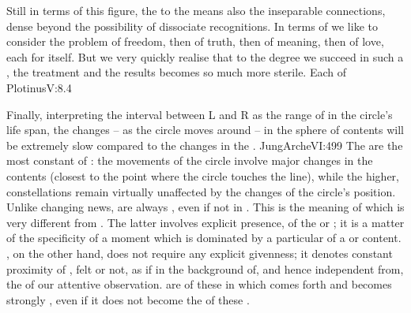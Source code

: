 Still in terms of this figure, the  to the  means also
the inseparable connections, dense beyond the possibility of dissociate
recognitions. In terms of  we like to
consider the problem of freedom, then of truth, then of meaning, then of love,
each for itself. But we very quickly realise that to the degree we succeed in
such a , the treatment and the results becomes so much more
sterile. Each of  \citet{contains all within itself, and at the
  same time sees all in every other, so that everywhere there is all, and all is
  all and each all [...] In our real all is part rising from part and nothing
  can be more than partial; but There each being is an eternal product of a
  whole and is at once a whole and an individual manifesting as part but, to the
  keen vision There, known for the whole it is.}{Plotinus}{V:8.4}

Finally, interpreting the interval between L and R as the range of
 in the circle's life span, the changes -- as the circle moves
around -- in the sphere of  contents will be extremely slow
compared to the changes in the .  \citet{Whereas we think
  in periods of years, the unconscious thinks and lives in terms of
  millennia.}{JungArche}{VI:499} The  are the most constant
 of : the movements of the circle involve major
changes in the  contents (closest to the point where the circle
touches the line), while the higher,  constellations remain
virtually unaffected by the changes of the circle's position.  Unlike changing
 news,  are always , even if not
 in . This is the meaning of 
which is very different from .  The latter involves explicit
presence,  of the  or ; it is a matter of the
specificity of a moment which is dominated by a particular  of a
 or  content.  , on the other hand,
does not require any explicit givenness; it denotes constant proximity of
, felt or not, as if in the background of, and hence independent
from, the  of our attentive observation.  are
 of these  in which  comes forth
and becomes strongly , even if it does not become the  of these .

